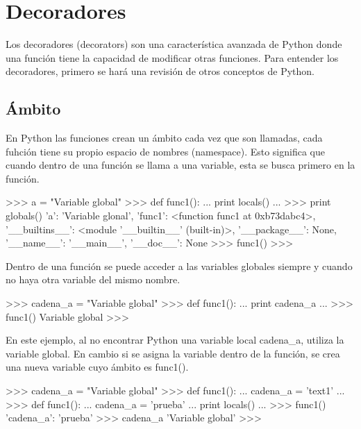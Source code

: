 \section{Decoradores}

Los decoradores (decorators) son una característica avanzada de Python donde una función tiene la capacidad de modificar otras funciones. Para entender los decoradores, primero se hará una revisión de otros conceptos de Python.

\subsection{Ámbito}

En Python las funciones crean un ámbito cada vez que son llamadas, cada fuhción tiene su propio espacio de nombres (namespace). Esto significa que cuando dentro de una función se llama a una variable, esta se busca primero en la función.\\

\begin{pyglist} [language=python]
>>> a = "Variable global"
>>> def func1():
...     print locals()
... 
>>> print globals()
{'a': 'Variable glonal', 'func1': <function func1 at 0xb73dabc4>, 
'__builtins__': <module '__builtin__' (built-in)>, 
'__package__': None, '__name__': '__main__', '__doc__': None}
>>> func1()
{}
>>> 
\end{pyglist}

Dentro de una función se puede acceder a las variables globales siempre y cuando no haya otra variable del mismo nombre.\\

\begin{pyglist} [language=python]
>>> cadena_a = "Variable global"
>>> def func1():
...     print cadena_a
... 
>>> func1()
Variable global
>>> 
\end{pyglist}

En este ejemplo, al no encontrar Python una variable local cadena\_a, utiliza la variable global. En cambio si se asigna la variable dentro de la función, se crea una nueva variable cuyo ámbito es func1().\\

\begin{pyglist} [language=python]
>>> cadena_a = "Variable global"
>>> def func1():
...     cadena_a = 'text1'
... 
>>> def func1():
...     cadena_a = 'prueba'
...     print locals()
... 
>>> func1()
{'cadena_a': 'prueba'}
>>> cadena_a
'Variable global'
>>> 
\end{pyglist}

